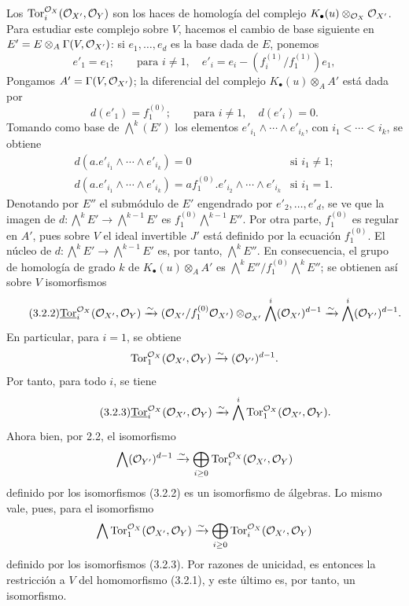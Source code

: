 Los \(\operatorname{Tor}_i^{\mathcal O_X}(\mathcal O_{X'},\mathcal O_Y)\) son los haces de homología del complejo \(K_\bullet(u)\otimes_{\mathcal O_X}\mathcal O_{X'}\). Para estudiar este complejo sobre \(V\), hacemos el cambio de base siguiente en \(E'=E\otimes_A\Gamma(V,\mathcal O_{X'})\): si \(e_1,\ldots,e_d\) es la base dada de \(E\), ponemos
\[
e'_1=e_1;\qquad \text{para }i\ne1,\quad
e'_i=e_i-(f_i^{(1)}/f_1^{(1)})e_1,
\] %
Pongamos \(A'=\Gamma(V,\mathcal O_{X'})\); la diferencial del complejo \(K_\bullet(u)\otimes_A A'\) está dada por
\[
d(e'_1)=f_1^{(0)};\qquad \text{para }i\ne1,\quad d(e'_i)=0.
\]
Tomando como base de \(\bigwedge^k(E')\) los elementos
\(e'_{i_1}\wedge\cdots\wedge e'_{i_k}\), con \(i_1<\cdots<i_k\), se obtiene
\[
\begin{array}{ll}
d(a.e'_{i_1}\wedge\cdots\wedge e'_{i_k})=0
&\text{si }i_1\ne1;\\[3pt]
d(a.e'_{i_1}\wedge\cdots\wedge e'_{i_k})=
af_1^{(0)}.e'_{i_2}\wedge\cdots\wedge e'_{i_k}
&\text{si }i_1=1.
\end{array}
\]
Denotando por \(E''\) el submódulo de \(E'\) engendrado por \(e'_2,\ldots,e'_d\), se ve que la imagen de \(d:\bigwedge^kE'\longrightarrow\bigwedge^{k-1}E'\) es \(f_1^{(0)}\bigwedge^{k-1}E''\). Por otra parte, \(f_1^{(0)}\) es regular en \(A'\), pues sobre \(V\) el ideal invertible \(J'\) está definido por la ecuación \(f_1^{(0)}\). El núcleo de \(d:\bigwedge^kE'\longrightarrow\bigwedge^{k-1}E'\) es, por tanto, \(\bigwedge^kE''\). En consecuencia, el grupo de homología de grado \(k\) de \(K_\bullet(u)\otimes_AA'\) es \(\bigwedge^kE''/f_1^{(0)}\bigwedge^kE''\); se obtienen así sobre \(V\) isomorfismos
\begin{equation}\tag{3.2.2}
\underline{\operatorname{Tor}}_i^{\mathcal O_X}(\mathcal O_{X'},\mathcal O_Y)
\xrightarrow{\sim}
(\mathcal O_{X'}/f_1^{(0)}\mathcal O_{X'})\otimes_{\mathcal O_{X'}}
\bigwedge^i(\mathcal O_{X'})^{d-1}
\xrightarrow{\sim}
\bigwedge^i(\mathcal O_{Y'})^{d-1}.
\end{equation}
En particular, para \(i=1\), se obtiene
\[
\operatorname{Tor}_1^{\mathcal O_X}(\mathcal O_{X'},\mathcal O_Y)
\xrightarrow{\sim}
(\mathcal O_{Y'})^{d-1}.
\]
Por tanto, para todo \(i\), se tiene
\begin{equation}\tag{3.2.3}
\underline{\operatorname{Tor}}_i^{\mathcal O_X}(\mathcal O_{X'},\mathcal O_Y)
\xrightarrow{\sim}
\bigwedge^i\operatorname{Tor}_1^{\mathcal O_X}(\mathcal O_{X'},\mathcal O_Y).
\end{equation}
Ahora bien, por 2.2, el isomorfismo
\[
\bigwedge(\mathcal O_{Y'})^{d-1}
\xrightarrow{\sim}
\bigoplus_{i\ge0}\operatorname{Tor}_i^{\mathcal O_X}(\mathcal O_{X'},\mathcal O_Y)
\]
definido por los isomorfismos (3.2.2) es un isomorfismo de álgebras. Lo mismo vale, pues, para el isomorfismo
\[
\bigwedge\operatorname{Tor}_1^{\mathcal O_X}(\mathcal O_{X'},\mathcal O_Y)
\xrightarrow{\sim}
\bigoplus_{i\ge0}\operatorname{Tor}_i^{\mathcal O_X}(\mathcal O_{X'},\mathcal O_Y)
\]
definido por los isomorfismos (3.2.3). Por razones de unicidad, es entonces la restricción a \(V\) del homomorfismo (3.2.1), y este último es, por tanto, un isomorfismo.

